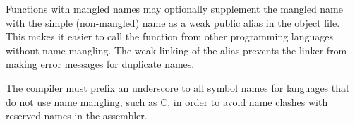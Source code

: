 \documentclass[forwardcom.tex]{subfiles}
\begin{document}
Functions with mangled names may optionally supplement the mangled name with the simple (non-mangled) name as a weak public alias in the object file. This makes it easier to call the function from other programming languages without name mangling. The weak linking of the alias prevents the linker from making error messages for duplicate names.
\vspace{2mm}

The compiler must prefix an underscore to all symbol names for languages that do not use name mangling, such as C, in order to avoid name clashes with reserved names in the assembler.
\vspace{2mm}
\end{document}
